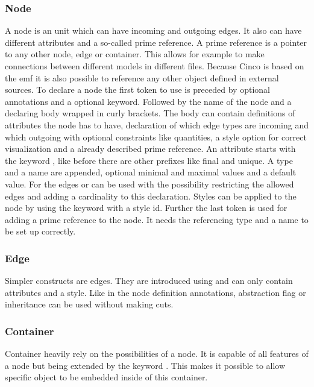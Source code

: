 \subsubsection{Node}

A node is an unit which can have incoming and outgoing edges. It also can have different attributes and a so-called prime reference. A prime reference is a pointer to any other node, edge or container. This allows for example to make connections between different models in different files. Because Cinco is based on the \gls{emf} it is also possible to reference any other object defined in external sources. To declare a node the first token to use is  preceded by optional annotations and a optional  keyword. Followed by the name of the node and a declaring body wrapped in curly brackets. The body can contain definitions of attributes the node has to have, declaration of which edge types are incoming and which outgoing with optional constraints like quantities, a style option for correct visualization and a already described prime reference. An attribute starts with the keyword , like before there are other prefixes like final and unique. A type and a name are appended, optional minimal and maximal values and a default value. For the edges  or  can be used with the possibility restricting the allowed edges and adding a cardinality to this declaration. Styles can be applied to the node by using the  keyword with a style id.
Further the last token  is used for adding a prime reference to the node. It needs the referencing type and a name to be set up correctly.

\subsubsection{Edge}
Simpler constructs are edges. They are introduced using  and can only contain attributes and a style. Like in the node definition annotations, abstraction flag or inheritance can be used without making cuts.

\subsubsection{Container}
Container heavily rely on the possibilities of a node. It is capable of all features of a node but being extended by the keyword . This makes it possible to allow specific object to be embedded inside of this container.


